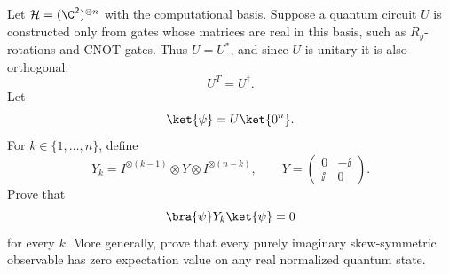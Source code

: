 Let $\mathcal H=(\C^2)^{\otimes n}$ with the computational basis.  Suppose a quantum circuit $U$ is constructed only from gates whose matrices are real in this basis, such as $R_y$-rotations and CNOT gates.  Thus $U=U^*$, and since $U$ is unitary it is also orthogonal:
$$
    U^T=U^\dagger.
$$
Let
$$
    \ket{\psi}=U\ket{0^n}.
$$
For $k\in\{1,\dots,n\}$, define
$$
    Y_k=I^{\otimes(k-1)}\otimes Y\otimes I^{\otimes(n-k)},
    \qquad
    Y=\begin{pmatrix}0&-\ii\\ \ii&0\end{pmatrix}.
$$
Prove that
$$
    \bra{\psi}Y_k\ket{\psi}=0
$$
for every $k$.  More generally, prove that every purely imaginary skew-symmetric observable has zero expectation value on any real normalized quantum state.
